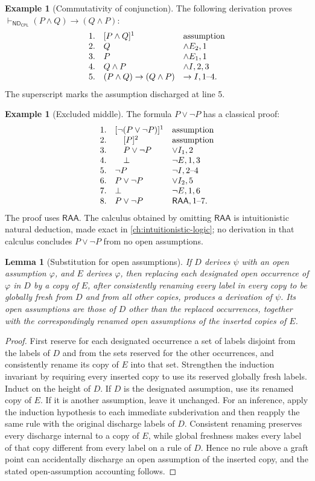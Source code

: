 \documentclass[11pt,oneside,openany]{book}
\theoremstyle{definition}
\newtheorem{example}[definition]{Example}
\theoremstyle{plain}
\newtheorem{lemma}[definition]{Lemma}
\theoremstyle{remark}
\newcommand{\derives}{\vdash}
\newcommand{\bottom}{\bot}
\newcommand{\ND}{\mathsf{ND}}
\newcommand{\CPL}{\mathsf{CPL}}
\begin{document}
\begin{example}[Commutativity of conjunction]
The following derivation proves
\(\derives_{\ND_{\CPL}}(P\land Q)\to(Q\land P)\):
\[
\begin{array}{rll}
1.&[P\land Q]^1&\text{assumption}\cr
2.&Q&\land E_2,1\cr
3.&P&\land E_1,1\cr
4.&Q\land P&\land I,2,3\cr
5.&(P\land Q)\to(Q\land P)&\to I,1\text{--}4.
\end{array}
\]
The superscript marks the assumption discharged at line 5.
\end{example}

\begin{example}[Excluded middle]
The formula \(P\lor\neg P\) has a classical proof:
\[
\begin{array}{rll}
1.&[\neg(P\lor\neg P)]^1&\text{assumption}\cr
2.&\quad[P]^2&\text{assumption}\cr
3.&\quad P\lor\neg P&\lor I_1,2\cr
4.&\quad\bottom&\neg E,1,3\cr
5.&\neg P&\neg I,2\text{--}4\cr
6.&P\lor\neg P&\lor I_2,5\cr
7.&\bottom&\neg E,1,6\cr
8.&P\lor\neg P&\mathsf{RAA},1\text{--}7.
\end{array}
\]
The proof uses \(\mathsf{RAA}\).  The calculus obtained by omitting
\(\mathsf{RAA}\) is intuitionistic natural deduction, made exact in
\cref{ch:intuitionistic-logic}; no derivation in that calculus concludes
\(P\lor\neg P\) from no open assumptions.
\end{example}

\begin{lemma}[Substitution for open assumptions]
\label{lem:nd-substitution}
If \(D\) derives \(\psi\) with an open assumption \(\varphi\), and \(E\)
derives \(\varphi\), then replacing each designated open occurrence of
\(\varphi\) in \(D\) by a copy of \(E\), after consistently renaming every
label in every copy to be globally fresh from \(D\) and from all other copies,
produces a derivation of \(\psi\).  Its open assumptions are those of \(D\)
other than the replaced occurrences, together with the correspondingly
renamed open assumptions of the inserted copies of \(E\).
\end{lemma}
\begin{proof}
First reserve for each designated occurrence a set of labels disjoint from
the labels of \(D\) and from the sets reserved for the other occurrences, and
consistently rename its copy of \(E\) into that set.  Strengthen the induction
invariant by requiring every inserted copy to use its reserved globally fresh
labels.  Induct on the height of \(D\).  If \(D\) is the designated
assumption, use its renamed copy of \(E\).  If it is another assumption, leave
it unchanged.  For an inference, apply the induction hypothesis to each
immediate subderivation and then reapply the same rule with the original
discharge labels of \(D\).  Consistent renaming preserves every discharge
internal to a copy of \(E\), while global freshness makes every label of that
copy different from every label on a rule of \(D\).  Hence no rule above a
graft point can accidentally discharge an open assumption of the inserted
copy, and the stated open-assumption accounting follows.
\end{proof}
\end{document}
